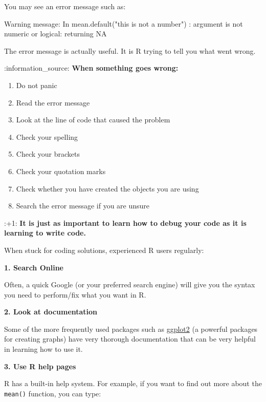 \documentclass[
]{book}
\newenvironment{Shaded}{\begin{snugshade}}{\end{snugshade}}
\newcommand{\NormalTok}[1]{#1}
\providecommand{\tightlist}{%
  \setlength{\itemsep}{0pt}\setlength{\parskip}{0pt}}
\begin{document}
You may see an error message such as:

\begin{Shaded}
\begin{Highlighting}[]
\NormalTok{Warning message:}
\NormalTok{In mean.default("this is not a number") :}
\NormalTok{  argument is not numeric or logical: returning NA}
\end{Highlighting}
\end{Shaded}

The error message is actually useful. It is R trying to tell you what went wrong.

:information\_source: \textbf{When something goes wrong:}

\begin{enumerate}
\def\labelenumi{\arabic{enumi}.}
\tightlist
\item
  Do not panic
\item
  Read the error message
\item
  Look at the line of code that caused the problem
\item
  Check your spelling
\item
  Check your brackets
\item
  Check your quotation marks
\item
  Check whether you have created the objects you are using
\item
  Search the error message if you are unsure
\end{enumerate}

:+1: \textbf{It is just as important to learn how to debug your code as it is learning to write code.}

When stuck for coding solutions, experienced R users regularly:

\textbf{1. Search Online}

Often, a quick Google (or your preferred search engine) will give you the syntax you need to perform/fix what you want in R.

\textbf{2. Look at documentation}

Some of the more frequently used packages such as \href{https://ggplot2.tidyverse.org/}{ggplot2} (a powerful packages for creating graphs) have very thorough documentation that can be very helpful in learning how to use it.

\textbf{3. Use R help pages}

R has a built-in help system. For example, if you want to find out more about the \texttt{mean()} function, you can type:
\end{document}
